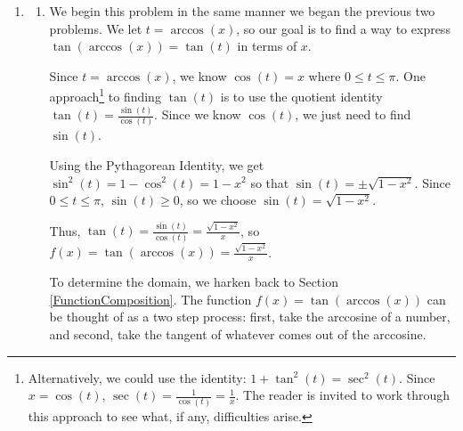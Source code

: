 \documentclass{ximera}
\begin{document}
\begin{example}
\begin{explanation}
\begin{enumerate}
\begin{enumerate}
 

Since $\cos(t) < 0$,  we can narrow this down a bit and conclude that $\frac{\pi}{2} < t < \pi$, so that $t$ corresponds to an angle in Quadrant II. 

 

In terms of $t$, then, we need to find $\sin\left(\arccos\left(-\frac{3}{5}\right)\right) = \sin(t)$, and since we know $\cos(t)$, the fastest route is through the Pythagorean Identity.  

  

We get $\sin^{2}(t) = 1 - \cos^{2}(t) = 1 - \left(-\frac{3}{5}\right)^2 = \frac{16}{25}$.  Since $t$ corresponds to a Quadrant II angle, we choose the positive root, $\sin(t) = \frac{4}{5}$, so $\sin\left(\arccos\left(-\frac{3}{5}\right)\right) = \frac{4}{5}$.

\end{enumerate}

\item

\begin{enumerate}

\item We begin this problem in the same manner we began the previous two problems.  We let  $t = \arccos(x)$, so our goal is to find a way to express $\tan\left(\arccos\left(x \right)\right) = \tan(t)$ in terms of $x$.  

 

Since $t = \arccos(x)$, we know $\cos(t) = x$ where $0 \leq t \leq \pi$.   One approach\footnote{Alternatively, we could use the identity:  $1 + \tan^{2}(t) = \sec^{2}(t)$.  Since $x = \cos(t)$,  $\sec(t) = \frac{1}{\cos(t)} = \frac{1}{x}$.  The reader is invited to work through this approach to see what, if any, difficulties arise.} to finding $\tan(t)$ is to use the quotient identity $\tan(t) = \frac{\sin(t)}{\cos(t)}$.  Since we know $\cos(t)$, we just need to find $\sin(t)$.

 

Using the Pythagorean Identity, we get  $\sin^{2}(t) = 1 - \cos^{2}(t) = 1 - x^2$ so that $\sin(t) = \pm \sqrt{1-x^2}$.  Since $0 \leq t \leq \pi$,   $\sin(t) \geq 0$, so we choose $\sin(t) = \sqrt{1-x^2}$.  

 

Thus, $\tan(t) = \frac{\sin(t)}{\cos(t)} = \frac{\sqrt{1-x^2}}{x}$, so $f(x) = \tan(\arccos(x)) =  \frac{\sqrt{1-x^2}}{x}$.

 

To determine the domain, we harken back to Section \ref{FunctionComposition}.  The function $f(x) = \tan\left(\arccos\left(x \right)\right)$ can be thought of as a two step process:  first, take the arccosine of a number, and second, take the tangent of whatever comes out of the arccosine.


\end{enumerate}
\end{enumerate}
\end{explanation}
\end{example}
\end{document}
